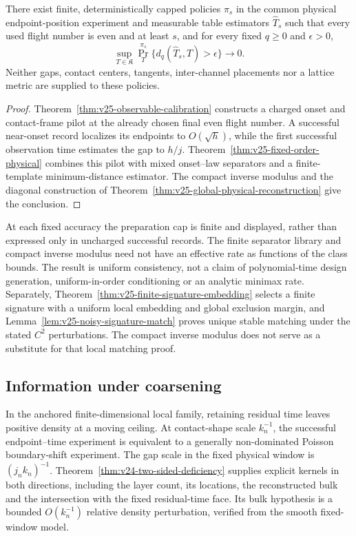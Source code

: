 \begin{theorem}
\label{thm:v25-intro-physical}
There exist finite, deterministically capped policies \(\pi_s\) in the
common physical endpoint-position experiment and measurable table estimators
\(\widehat T_s\) such that every used flight number is even and at least
\(s\), and for every fixed \(q\ge0\) and \(\epsilon>0\),
\[
 \sup_{T\in\mathfrak K}\Pr_T^{\pi_s}
                  \{d_q(\widehat T_s,T)>\epsilon\}\longrightarrow0.
\]
Neither gaps, contact centers, tangents, inter-channel placements nor a
lattice metric are supplied to these policies.
\end{theorem}

\begin{proof}
Theorem~\ref{thm:v25-observable-calibration} constructs a charged onset and
contact-frame pilot at the already chosen final even flight number.  A
successful near-onset record localizes its endpoints to \(O(\sqrt h)\),
while the first successful observation time estimates the gap to \(h/j\).
Theorem~\ref{thm:v25-fixed-order-physical} combines this pilot with mixed
onset--law separators and a finite-template minimum-distance estimator.
The compact inverse modulus and the diagonal construction of
Theorem~\ref{thm:v25-global-physical-reconstruction} give the conclusion.
\end{proof}

At each fixed accuracy the preparation cap is finite and displayed, rather
than expressed only in uncharged successful records.  The finite separator
library and compact inverse modulus need not have an effective rate as
functions of the class bounds.  The result is uniform consistency, not a
claim of polynomial-time design generation, uniform-in-order conditioning
or an analytic minimax rate.  Separately,
Theorem~\ref{thm:v25-finite-signature-embedding} selects a finite signature
with a uniform local embedding and global exclusion margin, and
Lemma~\ref{lem:v25-noisy-signature-match} proves unique stable matching under
the stated \(C^2\) perturbations.  The compact inverse modulus does not
serve as a substitute for that local matching proof.

\subsection{Information under coarsening}

In the anchored finite-dimensional local family, retaining residual time
leaves positive density at a moving ceiling.  At contact-shape scale
\(k_n^{-1}\), the successful endpoint--time experiment is equivalent to
a generally non-dominated Poisson boundary-shift experiment.  The gap scale
in the fixed physical window is \((j_nk_n)^{-1}\).
Theorem~\ref{thm:v24-two-sided-deficiency} supplies explicit kernels in
both directions, including the layer count, its locations, the reconstructed
bulk and the intersection with the fixed residual-time face.  Its bulk
hypothesis is a bounded \(O(k_n^{-1})\) relative density perturbation,
verified from the smooth fixed-window model.

